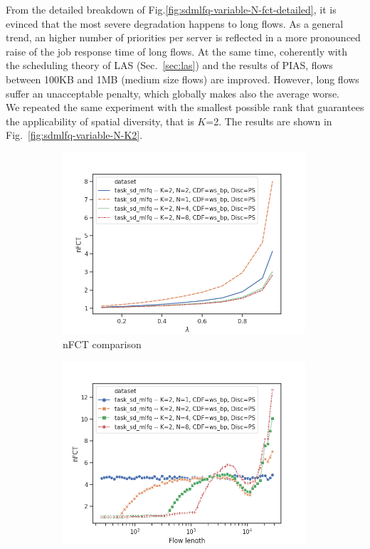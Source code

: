 From the detailed breakdown of Fig.\ref{fig:sdmlfq-variable-N-fct-detailed}, it is evinced that the most severe degradation happens to long flows. As a general trend, an higher number of priorities per server is reflected in a more pronounced raise of the job response time of long flows. At the same time, coherently with the scheduling theory of LAS (Sec.~\ref{sec:las}) and the results of PIAS, flows between 100KB and 1MB (medium size flows) are improved. However, long flows suffer an unacceptable penalty, which globally makes also the average worse.  \\
We repeated the same experiment with the smallest possible rank that guarantees the applicability of spatial diversity, that is $K$=2. The results are shown in Fig.~\ref{fig:sdmlfq-variable-N-K2}. 
\begin{figure}
	\centering
	\begin{subfigure}{.5\textwidth}
		\centering
		\includegraphics[width=0.99\textwidth]{Chapter3/Figures/sd_mlfq_k2_comparison.png}
		\caption{nFCT comparison}
		\label{fig:sdmlfq-variable-N-fct-K2}
	\end{subfigure}%
	\hfill
	\begin{subfigure}{.5\textwidth}
		\centering
		\includegraphics[width=0.99\textwidth]{Chapter3/Figures/sd_mlfq_k2_detailed.png}

\end{subfigure}
\end{figure}
